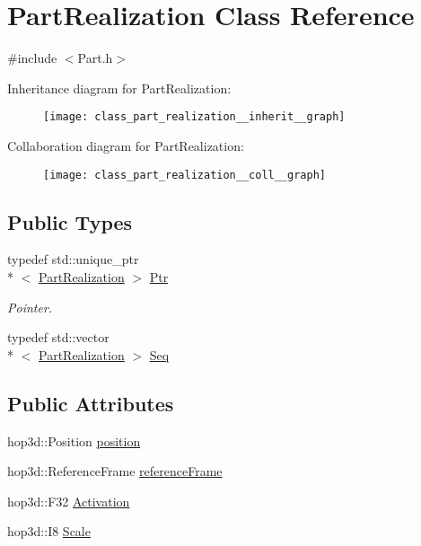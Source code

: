 \hypertarget{class_part_realization}{\section{Part\-Realization Class Reference}
\label{class_part_realization}
}


{\ttfamily \#include $<$Part.\-h$>$}



Inheritance diagram for Part\-Realization\-:\nopagebreak
\begin{figure}[H]
\begin{center}
\leavevmode
\texttt{[image: class\_part\_realization\_\_inherit\_\_graph]}
\end{center}
\end{figure}


Collaboration diagram for Part\-Realization\-:\nopagebreak
\begin{figure}[H]
\begin{center}
\leavevmode
\texttt{[image: class\_part\_realization\_\_coll\_\_graph]}
\end{center}
\end{figure}
\subsection*{Public Types}
\begin{DoxyCompactItemize}
\item 
typedef std\-::unique\-\_\-ptr\\*
$<$ \hyperlink{class_part_realization}{Part\-Realization} $>$ \hyperlink{class_part_realization_aec2d1af3a61dba0792d0d95bf32e7118}{Ptr}
\begin{DoxyCompactList}\small\item\em Pointer. \end{DoxyCompactList}\item 
typedef std\-::vector\\*
$<$ \hyperlink{class_part_realization}{Part\-Realization} $>$ \hyperlink{class_part_realization_ac53d0830ece33a44aaf825f109e00f59}{Seq}
\end{DoxyCompactItemize}
\subsection*{Public Attributes}
\begin{DoxyCompactItemize}
\item 
hop3d\-::\-Position \hyperlink{class_part_realization_a64e569cf60fcec7d6e31c47ea0a46e6e}{position}
\item 
hop3d\-::\-Reference\-Frame \hyperlink{class_part_realization_a31f7d192d8e527643997fa79aba5c28c}{reference\-Frame}
\item 
hop3d\-::\-F32 \hyperlink{class_part_realization_a814790d0300a7f1b3be036031e92fec0}{Activation}
\item 
hop3d\-::\-I8 \hyperlink{class_part_realization_acd7a731093a911fc165649d1a4baa96d}{Scale}
\end{DoxyCompactItemize}

